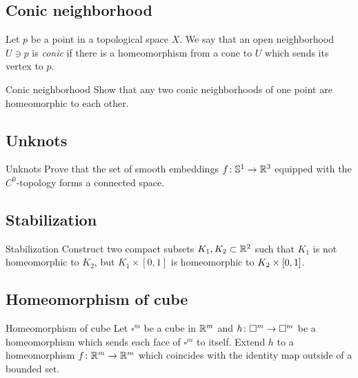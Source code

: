 \subsection*{Conic neighborhood}
\label{Conic neighborhood}

Let $p$ be a point in a topological space $X$.
We say that an open neighborhood $U\ni p$ is \emph{conic}
if there is a homeomorphism from a cone
to $U$ which sends its vertex to $p$.

\begin{pr}{}{Conic neighborhood}  
Show that any two conic neighborhoods of one point are homeomorphic to each other.
\end{pr}

\subsection*{Unknots}

\begin{pr}{}{Unknots}\label{No knots}
Prove that the set of smooth embeddings $f\:\mathbb{S}^1\z\to\RR^3$ equipped with the $C^0$-topology 
forms a connected space.
\end{pr}

\subsection*{Stabilization}

\begin{pr}{}{Stabilization}\label{Simple stabilization}
Construct two compact subsets $K_1, K_2\subset\mathbb{R}^2$ such that
$K_1$ is not homeomorphic to $K_2$, but $K_1\times[0,1]$ is homeomorphic to $K_2\z\times[0,1]$.
\end{pr}

\subsection*{Homeomorphism of cube}

\begin{pr}{}{Homeomorphism of cube}\label{Homeomorphism of cube}
Let $\square^m$ be a cube in $\mathbb{R}^m$
and $h\:\square^m\z\to\square^m$ be
a homeomorphism which sends each face of $\square^m$ to itself.
Extend $h$ to a homeomorphism $f\colon\mathbb{R}^m\to\mathbb{R}^m$ which coincides with the identity map outside of a bounded set.    
\end{pr}

